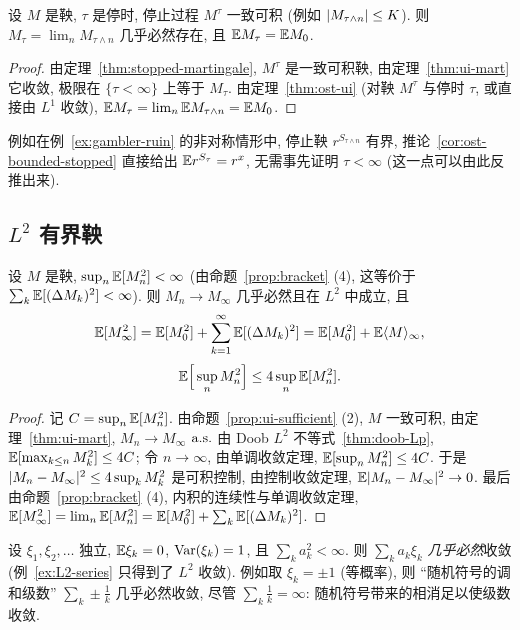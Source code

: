 \begin{corollary}\label{cor:ost-bounded-stopped}
设 $M$ 是鞅, $\tau$ 是停时, 停止过程 $M^\tau$ 一致可积 (例如 $\lvert M_{\tau\wedge n}\rvert\le K$). 则 $M_\tau=\lim_nM_{\tau\wedge n}$ 几乎必然存在, 且 $\mathbb{E} M_\tau=\mathbb{E} M_0$.
\end{corollary}

\begin{proof}
由定理~\ref{thm:stopped-martingale}, $M^\tau$ 是一致可积鞅, 由定理~\ref{thm:ui-mart} 它收敛, 极限在 $\{\tau<\infty\}$ 上等于 $M_\tau$. 由定理~\ref{thm:ost-ui} (对鞅 $M^\tau$ 与停时 $\tau$, 或直接由 $L^1$ 收敛), $\mathbb{E} M_\tau=\lim_n\mathbb{E} M_{\tau\wedge n}=\mathbb{E} M_0$.
\end{proof}

例如在例~\ref{ex:gambler-ruin} 的非对称情形中, 停止鞅 $r^{S_{\tau\wedge n}}$ 有界, 推论~\ref{cor:ost-bounded-stopped} 直接给出 $\mathbb{E} r^{S_\tau}=r^x$, 无需事先证明 $\tau<\infty$ (这一点可以由此反推出来).

\subsection{\texorpdfstring{$L^2$}{L2} 有界鞅}

\begin{theorem}[$L^2$ 有界鞅收敛定理]\label{thm:L2-mart}
设 $M$ 是鞅, $\sup_n\mathbb{E}[M_n^2]<\infty$ (由命题~\ref{prop:bracket} (4), 这等价于 $\sum_k\mathbb{E}[(\Delta M_k)^2]<\infty$). 则 $M_n\to M_\infty$ 几乎必然且在 $L^2$ 中成立, 且
\[
\mathbb{E}[M_\infty^2]=\mathbb{E}[M_0^2]+\sum_{k=1}^\infty\mathbb{E}[(\Delta M_k)^2]=\mathbb{E}[M_0^2]+\mathbb{E}\langle M\rangle_\infty,
\]
\[
\mathbb{E}\Big[\sup_nM_n^2\Big]\le4\sup_n\mathbb{E}[M_n^2].
\]
\end{theorem}

\begin{proof}
记 $C=\sup_n\mathbb{E}[M_n^2]$. 由命题~\ref{prop:ui-sufficient} (2), $M$ 一致可积, 由定理~\ref{thm:ui-mart}, $M_n\to M_\infty$ $\text{a.s.}$ 由 Doob $L^2$ 不等式~\ref{thm:doob-Lp}, $\mathbb{E}[\max_{k\le n}M_k^2]\le4C$; 令 $n\to\infty$, 由单调收敛定理, $\mathbb{E}[\sup_nM_n^2]\le4C$. 于是 $\lvert M_n-M_\infty\rvert^2\le4\sup_kM_k^2$ 是可积控制, 由控制收敛定理, $\mathbb{E}\lvert M_n-M_\infty\rvert^2\to0$. 最后由命题~\ref{prop:bracket} (4), 内积的连续性与单调收敛定理, $\mathbb{E}[M_\infty^2]=\lim_n\mathbb{E}[M_n^2]=\mathbb{E}[M_0^2]+\sum_k\mathbb{E}[(\Delta M_k)^2]$.
\end{proof}

\begin{example}[随机级数]\label{ex:random-series}
设 $\xi_1,\xi_2,\dots$ 独立, $\mathbb{E}\xi_k=0$, $\operatorname{Var}(\xi_k)=1$, 且 $\sum_ka_k^2<\infty$. 则 $\sum_ka_k\xi_k$ \emph{几乎必然}收敛 (例~\ref{ex:L2-series} 只得到了 $L^2$ 收敛). 例如取 $\xi_k=\pm1$ (等概率), 则 ``随机符号的调和级数'' $\sum_k\pm\frac{1}{k}$ 几乎必然收敛, 尽管 $\sum_k\frac{1}{k}=\infty$: 随机符号带来的相消足以使级数收敛.
\end{example}

